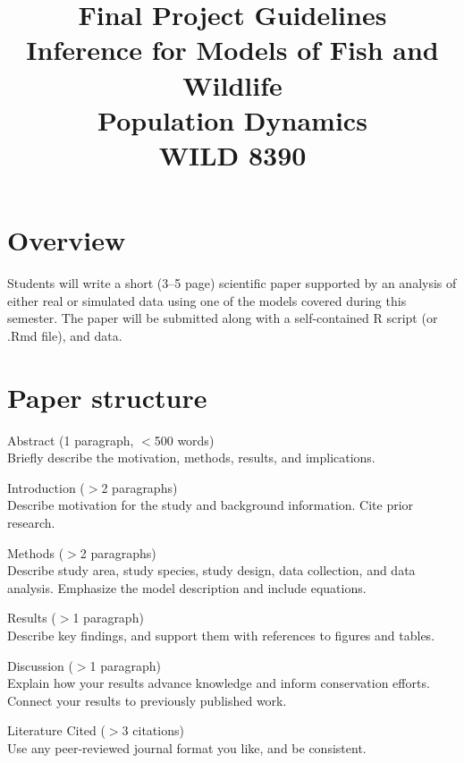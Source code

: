 \documentclass[12pt]{article}
\title{Final Project Guidelines \\ %
  Inference for Models of Fish and Wildlife \\ Population Dynamics \\ WILD 8390}
\date{}
\begin{document}

\maketitle

\vspace{-48pt}

\section*{Overview}

Students will write a short (3--5 page) scientific paper supported by
an analysis of either real or simulated data using one of the models
covered during this semester. The paper will be submitted
along with a self-contained R script (or .Rmd file), and data.


\section*{Paper structure}

Abstract (1 paragraph, $<$500 words) \\
Briefly describe the motivation, methods, results, and
implications. %
\vspace{6pt}

Introduction ($>$2 paragraphs) \\
Describe motivation for the study and background information. Cite
prior research. 
\vspace{6pt}

Methods  ($>$2 paragraphs) \\
Describe study area, study species, study design, data collection, and
data analysis. Emphasize the model description and include equations.
\vspace{6pt}

Results  ($>$1 paragraph) \\
Describe key findings, and support them with references to figures and tables.
\vspace{6pt}

Discussion  ($>$1 paragraph) \\
Explain how your results advance knowledge and inform conservation
efforts. Connect your results to previously published work.
\vspace{6pt}

Literature Cited  ($>$3 citations) \\
Use any peer-reviewed journal format you like, and be consistent.
\end{document}
